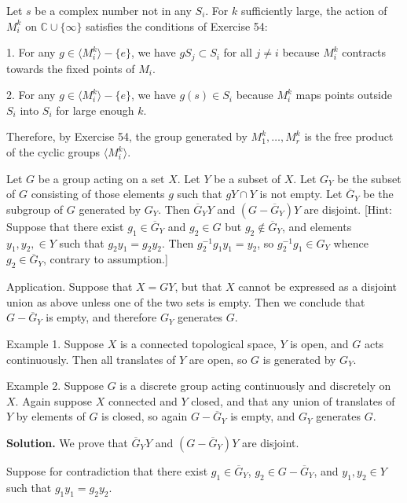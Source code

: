 Let $s$ be a complex number not in any $S_i$. For $k$ sufficiently large, the action of $M_i^k$ on $\mathbb{C} \cup \{\infty\}$ satisfies the conditions of Exercise 54:

1. For any $g \in \langle M_i^k \rangle - \{e\}$, we have $gS_j \subset S_i$ for all $j \neq i$ because $M_i^k$ contracts towards the fixed points of $M_i$.

2. For any $g \in \langle M_i^k \rangle - \{e\}$, we have $g(s) \in S_i$ because $M_i^k$ maps points outside $S_i$ into $S_i$ for large enough $k$.

Therefore, by Exercise 54, the group generated by $M_1^k, \ldots, M_r^k$ is the free product of the cyclic groups $\langle M_i^k \rangle$.

\begin{problembox}
Let $G$ be a group acting on a set $X$. Let $Y$ be a subset of $X$. Let $G_Y$ be the subset of $G$ consisting of those elements $g$ such that $gY \cap Y$ is not empty. Let $\overline{G}_Y$ be the subgroup of $G$ generated by $G_Y$. Then $\overline{G}_Y Y$ and $(G - \overline{G}_Y)Y$ are disjoint. [Hint: Suppose that there exist $g_1 \in \overline{G}_Y$ and $g_2 \in G$ but $g_2 \notin \overline{G}_Y$, and elements $y_1, y_2, \in Y$ such that $g_2y_1 = g_2y_2$. Then $g_2^{-1}g_1y_1 = y_2$, so $g_2^{-1}g_1 \in G_Y$ whence $g_2 \in \overline{G}_Y$, contrary to assumption.]

Application. Suppose that $X = GY$, but that $X$ cannot be expressed as a disjoint union as above unless one of the two sets is empty. Then we conclude that $G - \overline{G}_Y$ is empty, and therefore $G_Y$ generates $G$.

Example 1. Suppose $X$ is a connected topological space, $Y$ is open, and $G$ acts continuously. Then all translates of $Y$ are open, so $G$ is generated by $G_Y$.

Example 2. Suppose $G$ is a discrete group acting continuously and discretely on $X$. Again suppose $X$ connected and $Y$ closed, and that any union of translates of $Y$ by elements of $G$ is closed, so again $G - \overline{G}_Y$ is empty, and $G_Y$ generates $G$.
\end{problembox}

\noindent\textbf{Solution.} We prove that $\overline{G}_Y Y$ and $(G - \overline{G}_Y)Y$ are disjoint.

Suppose for contradiction that there exist $g_1 \in \overline{G}_Y$, $g_2 \in G - \overline{G}_Y$, and $y_1, y_2 \in Y$ such that $g_1y_1 = g_2y_2$.

